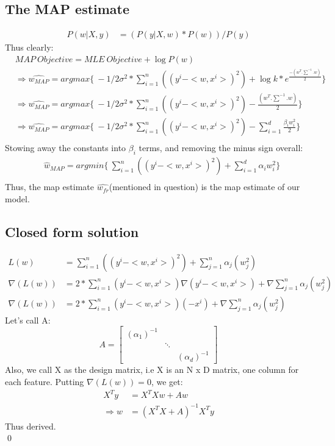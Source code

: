 \documentclass[a4paper,11pt]{article}
\begin{document}
\begin{mlsolution}
\subsection*{The MAP estimate}
\begin{align}
    P(w|X,y) &= (P(y|X,w) * P(w))/P(y)
\end{align}
Thus clearly:
\begin{align}
    &MAP \ Objective = MLE \ Objective + \log{P(w)}\\
    &\Rightarrow \hat{w_{MAP}} = argmax\{ \  -1/2\sigma^2 * \sum_{i=1}^{n}((y^i - < w,x^i >)^2) + \log{k*e^{\frac{-(w^T.\sum^{-1}.w)}{2}}}\}\\
    &\Rightarrow \hat{w_{MAP}} = argmax\{ \  -1/2\sigma^2 * \sum_{i=1}^{n}((y^i - < w,x^i >)^2) - {\frac{(w^T.\sum^{-1}.w)}{2}}\}\\
    &\Rightarrow \hat{w_{MAP}} = argmax\{ \  -1/2\sigma^2 * \sum_{i=1}^{n}((y^i - < w,x^i >)^2) - \sum_{i=1}^{d}\frac{{}\beta_{i}w_{i}^2}{2}\}\\
\end{align}
Stowing away the constants into $\beta_{i}$ terms, and removing the minus sign overall: \\
\begin{align}
    &\hat{w}_{MAP} = argmin\{ \ \sum_{i=1}^{n}((y^i - < w,x^i >)^2) + \sum_{i=1}^{d} \alpha_{i}w_{i}^2\}\\
\end{align}
Thus, the map estimate $\hat{w_{fr}}$(mentioned in question) is the map estimate of our model.

\subsection*{Closed form solution}
\begin{align}
    L(w) &= \sum_{i=1}^{n}((y^i - <w,x^i>)^2) + \sum_{j=1}^{n} \alpha_{j}(w_{j}^2)\\
    \nabla (L(w)) &= 2* \sum_{i=1}^{n}(y^i - <w,x^i>)\nabla (y^i - <w,x^i>) + \nabla \sum_{j=1}^{n} \alpha_{j}(w_{j}^2) \\
    \nabla (L(w)) &= 2* \sum_{i=1}^{n}(y^i - <w,x^i>)(-x^i) + \nabla \sum_{j=1}^{n} \alpha_{j}(w_{j}^2)
\end{align}
Let's call A: \\
\[
  A =
  \begin{bmatrix}
    (\alpha_{1})^{-1} & & \\
    & \ddots & \\
    & & (\alpha_{d})^{-1}
  \end{bmatrix}
\]
Also, we call X as the design matrix, i.e X is an N x D matrix, one column for each feature. Putting $\nabla (L(w)) = 0$, we get: \\
\begin{align}
    X^Ty &= X^TXw + Aw\\
    \Rightarrow w &= (X^TX + A)^{-1}X^Ty
\end{align}
Thus derived.\\
\qed
 
\end{mlsolution}
\end{document}
